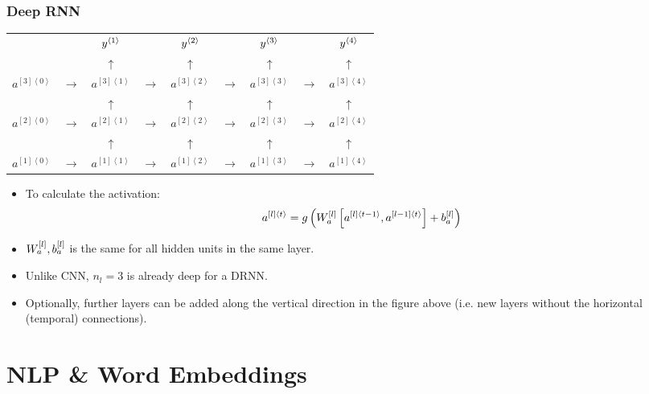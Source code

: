 \subsubsection{Deep RNN}
\newcommand{\drnnunit}[3]{#1^{\left[#2\right]\left\langle #3\right\rangle}}
\begin{center}
  \begin{tabular}{ccccccccc}
    && $y^{\left\langle 1\right\rangle}$ & & $y^{\left\langle 2\right\rangle}$ & & $y^{\left\langle 3\right\rangle}$ & & $y^{\left\langle 4\right\rangle}$\\
    && $\uparrow$ & &  $\uparrow$ & &  $\uparrow$ & &  $\uparrow$\\
    $\drnnunit{a}{3}{0}$ & $\rightarrow$ & $\boxed{\drnnunit{a}{3}{1}}$ & $\rightarrow$ & $\boxed{\drnnunit{a}{3}{2}}$ & $\rightarrow$ & $\boxed{\drnnunit{a}{3}{3}}$ & $\rightarrow$ & $\boxed{\drnnunit{a}{3}{4}}$ \\
    && $\uparrow$ & &  $\uparrow$ & &  $\uparrow$ & &  $\uparrow$\\
    $\drnnunit{a}{2}{0}$ & $\rightarrow$ & $\boxed{\drnnunit{a}{2}{1}}$ & $\rightarrow$ & $\boxed{\drnnunit{a}{2}{2}}$ & $\rightarrow$ & $\boxed{\drnnunit{a}{2}{3}}$ & $\rightarrow$ & $\boxed{\drnnunit{a}{2}{4}}$ \\
    && $\uparrow$ & &  $\uparrow$ & &  $\uparrow$ & &  $\uparrow$\\
    $\drnnunit{a}{1}{0}$ & $\rightarrow$ & $\boxed{\drnnunit{a}{1}{1}}$ & $\rightarrow$ & $\boxed{\drnnunit{a}{1}{2}}$ & $\rightarrow$ & $\boxed{\drnnunit{a}{1}{3}}$ & $\rightarrow$ & $\boxed{\drnnunit{a}{1}{4}}$ \\
  \end{tabular}
\end{center}
\begin{itemize}
  \item To calculate the activation:
  \begin{align*}
    \drnnunit{a}{l}{t}=g\left(\bracketss{W_a}{l}\left[\drnnunit{a}{l}{t-1},\drnnunit{a}{l-1}{t}\right]+\bracketss{b_a}{l}\right)
  \end{align*}
  \item $W_a^{\left[ l\right]},b_a^{\left[ l\right]}$ is the same for all hidden units in the same layer.
  \item Unlike CNN, $n_l=3$ is already deep for a DRNN.
  \item Optionally, further layers can be added along the vertical direction in the figure above (i.e. new layers without the horizontal (temporal) connections).
\end{itemize}
\section{NLP \& Word Embeddings}
\newcommand{\embedding}[1]{\mathbf{e}_{#1}}
\newcommand{\onehot}[1]{\mathbf{o}_{#1}}
